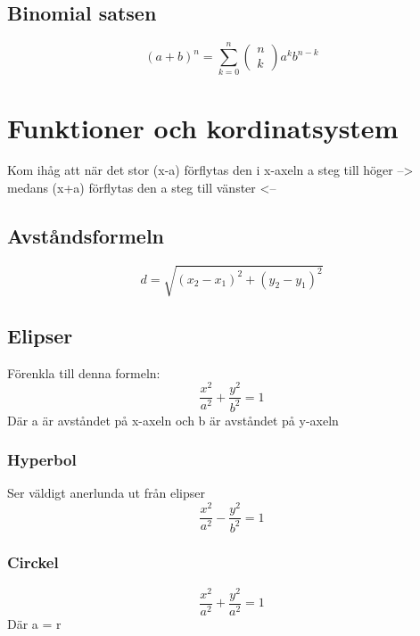 \subsection{Binomial satsen}
\begin{equation}
(a + b)^{n} = \displaystyle\sum _ { k = 0 } ^ { n } \left( \begin{array} { l } { n } \\ { k } \end{array} \right) a ^ {k} b ^ { n - k }
\end{equation}


\newpage

\section{Funktioner och kordinatsystem}
Kom ihåg att när det stor (x-a) förflytas den i x-axeln a steg till höger --> medans (x+a) förflytas den a steg till vänster <-- 
\subsection{Avståndsformeln}
\begin{equation}
d = \sqrt { \left( x _ { 2 } - x _ { 1 } \right) ^ { 2 } + \left( y _ { 2 } - y _ { 1 } \right) ^ { 2 } }
\end{equation}


\subsection{Elipser}
Förenkla till denna formeln:
\begin{equation}
\frac { x ^ { 2 } } { a ^ { 2 } } + \frac { y ^ { 2 } } { b ^ { 2 } } = 1
\end{equation}
Där a är avståndet på x-axeln och b är avståndet på y-axeln


\subsubsection{Hyperbol}
Ser väldigt anerlunda ut från elipser
\begin{equation}
\frac { x ^ { 2 } } { a ^ { 2 } } - \frac { y ^ { 2 } } { b ^ { 2 } } = 1
\end{equation}


\subsubsection{Circkel}
\begin{equation}
\frac { x ^ { 2 } } { a ^ { 2 } } + \frac { y ^ { 2 } } { a ^ { 2 } } = 1
\end{equation}
Där a = r


